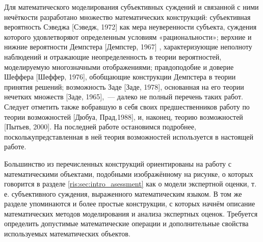 
\label{sec:math_methods_global}

Для математического моделирования субъективных суждений и связанной с ними нечёткости разработано множество математических конструкций: 
субъективная вероятность Сэведжа [Сэведж, 1972]  как мера неуверенности субъекта, суждения которого удовлетворяют определенным условиям «рациональности»; верхние и нижние вероятности Демпстера [Демпстер, 1967] , характеризующие неполноту наблюдений и отражающие неопределенность в теории вероятностей, моделируемую многозначными отображениями; правдоподобие и доверие Шеффера [Шеффер, 1976], обобщающие конструкции Демпстера в теории принятия решений; возможность Заде [Заде, 1978], основанная на его теории нечетких множеств [Заде, 1965],~--- далеко не полный перечень таких работ. Следует отметить также вобравшую в себя своих предшественников работу по теории возможностей [Дюбуа, Прад,1988], и, наконец, теорию возможностей [Пытьев, 2000]. На последней работе остановимся подробнее, посколькупредставленная в ней теория возможностей используется в настоящей работе.

Большинство из перечисленных конструкций ориентированы на работу с математическими объектами, подобными изображённому на рисунке, о которых говорится в разделе \ref{ris:sec:intro_asessment} как о модели экспертной оценки, т.\,е. субъективного суждения,  выраженного математическим языком.  В том же разделе упоминаются и более простые конструкции, с которых начнём описание математических методов моделирования и анализа экспертных оценок. Требуется определить допустимые математические операции и дополнительные свойства используемых математических объектов.


